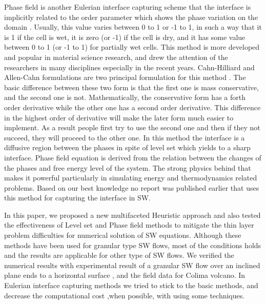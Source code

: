 \documentclass[letterpaper,10pt]{article}
\begin{document}
Phase field is another Eulerian interface capturing scheme that the interface is implicitly related to the order parameter which shows the phase variation on the domain \cite{Anderson1998}. 
Usually, this value varies between 0 to 1 or -1 to 1, in such a way that it is 1 if the cell is wet, it is zero (or -1) 
if the cell is dry, and it has some value between 0 to 1 (or -1 to 1) for partially wet cells.
This method is more developed and popular in material science research, and drew the attention of the researchers in many disciplines especially in the recent years.
Cahn-Hilliard and Allen-Cahn formulations are two principal formulation for this method \cite{CahnHilliard1958i,CahnHilliard1958ii,Yang2006}. The basic difference between these two form is that the first one is mass conservative, and the second one is not. Mathematically, the conservative form has a forth order derivative while the other one has a second order derivative. This difference in the highest order of derivative will make the later form much easier to implement. As a result people first try to use the second one and then if they not succeed, they will proceed to the other one.
In this method the interface is a diffusive region between the phases in spite of level set which yields to a sharp interface. Phase field equation is derived from the relation between the changes of the phases and free energy level of the 
system. The strong physics behind that makes it powerful particularly in simulating energy and thermodynamics related problems. Based on our best knowledge no report was published earlier that uses this method for capturing the interface in SW.\newline

In this paper, we proposed a new multifaceted Heuristic approach and also tested the effectiveness of Level set and Phase field methods to mitigate the thin layer problem difficulties for numerical solution of SW equations. Although these methods have been used for granular type SW flows, most of the conditions holds and the results are applicable for other type of SW flows.  We verified the numerical results with experimental result of a granular SW flow over an inclined plane ends to a horizontal surface , and the field data for Colima volcano.
In Eulerian interface capturing methods we tried to stick to the basic methods, and decrease the computational cost ,when possible, with using some techniques. \newline
\end{document}

